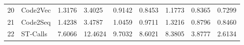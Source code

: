 \begin{table}[h]
{\begin{tabular}{ll|lllllll}
20 &         Code2Vec &              1.3176 &              3.4025 &              0.9142 &              0.8453 &              1.1773 &              0.8365 &              0.7299 \\
21 &         Code2Seq &              1.4238 &              3.4787 &              1.0459 &              0.9711 &              1.3216 &              0.8796 &              0.8460 \\
22 &         ST-Calls &              7.6066 &             12.4624 &              9.7032 &              8.6021 &              8.3805 &              3.8777 &              2.6134 \\
\bottomrule
\end{tabular}



    
    
    }


\end{table}

